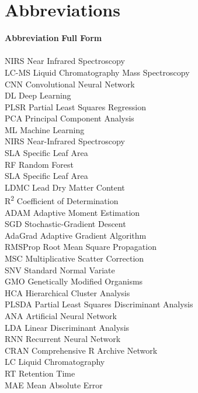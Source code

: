 \documentclass[12pt,a4paper]{report}
\begin{document}
\newpage
\tableofcontents

\newpage
\section*{Abbreviations}
\begin{tabbing}
    \textbf{Abbreviation} \hspace{2cm} \= \textbf{Full Form} \\
    \\
    NIRS \> Near Infrared Spectroscopy \\
    LC-MS \> Liquid Chromatography Mass Spectroscopy \\
    CNN \> Convolutional Neural Network \\
    DL \> Deep Learning \\
    PLSR \> Partial Least Squares Regression \\
    PCA \> Principal Component Analysis \\
    ML \> Machine Learning \\
    NIRS \> Near-Infrared Spectroscopy \\
    SLA \> Specific Leaf Area \\
    RF \> Random Forest \\
    SLA \> Specific Leaf Area \\
    LDMC \> Lead Dry Matter Content \\
    R\textsuperscript{2} \> Coefficient of Determination \\
    ADAM \> Adaptive Moment Estimation \\
    SGD \> Stochastic-Gradient Descent \\
    AdaGrad \> Adaptive Gradient Algorithm \\
    RMSProp \> Root Mean Square Propagation \\
    MSC \> Multiplicative Scatter Correction \\
    SNV \> Standard Normal Variate \\
    GMO \> Genetically Modified Organisms \\
    HCA \> Hierarchical Cluster Analysis \\
    PLSDA  \> Partial Least Squares Discriminant Analysis \\
    ANA \>  Artificial Neural Network \\
    LDA \> Linear Discriminant Analysis \\
    RNN \> Recurrent Neural Network \\
    CRAN \> Comprehensive R Archive Network \\
    LC \> Liquid Chromatography \\
    RT \> Retention Time \\
    MAE \> Mean Absolute Error \\
    
\end{tabbing}
\end{document}

